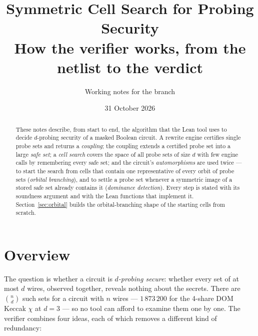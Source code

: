 \documentclass[11pt,a4paper]{article}
\title{Symmetric Cell Search for Probing Security\\[0.3em]
\large How the verifier works, from the netlist to the verdict}
\author{Working notes for the \code{engine-speed} branch}
\date{31 October 2026}
\theoremstyle{definition}
\theoremstyle{remark}
\begin{document}
\maketitle

\begin{abstract}
These notes describe, from start to end, the algorithm that the Lean tool uses to decide
$d$-probing security of a masked Boolean circuit.  A rewrite engine certifies single probe
sets and returns a \emph{coupling}; the coupling extends a certified probe set into a large
\emph{safe set}; a \emph{cell search} covers the space of all probe sets of size $d$ with
few engine calls by remembering every safe set; and the circuit's \emph{automorphisms} are
used twice --- to start the search from cells that contain one representative of every
orbit of probe sets (\emph{orbital branching}), and to settle a probe set whenever a
symmetric image of a stored safe set already contains it (\emph{dominance detection}).
Every step is stated with its soundness argument and with the Lean functions that
implement it.  Section~\ref{sec:orbital} builds the orbital-branching shape of the starting
cells from scratch.
\end{abstract}

\tableofcontents

\section{Overview}

The question is whether a circuit is \emph{$d$-probing secure}: whether every set of at
most $d$ wires, observed together, reveals nothing about the secrets.  There are
$\binom{n}{d}$ such sets for a circuit with $n$ wires --- $1\,873\,200$ for the 4-share
DOM Keccak $\chi$ at $d=3$ --- so no tool can afford to examine them one by one.  The
verifier combines four ideas, each of which removes a different kind of redundancy:
\end{document}
